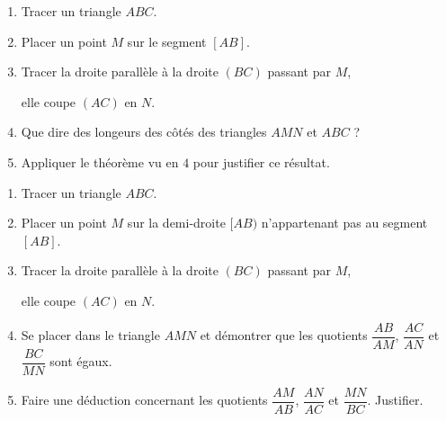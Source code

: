 \begin{activite}
    \partie[Configuration emboîtée]%
        \begin{minipage}{0.6\textwidth}
            \begin{enumerate}
                \item Tracer un triangle $ABC$.
                \item Placer un point $M$ sur le segment $[AB]$.
                \item Tracer la droite parallèle à la droite $(BC)$ passant par $M$,
                
                elle coupe $(AC)$ en $N$.
                \item Que dire des longeurs des côtés des triangles $AMN$ et $ABC$ ?
                \item Appliquer le théorème vu en $4$ pour justifier ce résultat.
            \end{enumerate}
        \end{minipage}
        \hspace*{1cm}
        \begin{minipage}{0.4\textwidth}
        \end{minipage}

        \begin{minipage}{0.6\textwidth}
            \begin{enumerate}
                \item Tracer un triangle $ABC$.
                \item Placer un point $M$ sur la demi-droite $[AB)$ n'appartenant pas au segment $[AB]$.
                \item Tracer la droite parallèle à la droite $(BC)$ passant par $M$,
                
                elle coupe $(AC)$ en $N$.
                \item Se placer dans le triangle $AMN$ et démontrer que les quotients
                $\dfrac{AB}{AM}$, $\dfrac{AC}{AN}$ et $\dfrac{BC}{MN}$ sont égaux.
                \item Faire une déduction concernant les quotients $\dfrac{AM}{AB}$, $\dfrac{AN}{AC}$ et $\dfrac{MN}{BC}$. Justifier.
            \end{enumerate}
        \end{minipage}
        \hspace*{1cm}
        \begin{minipage}{0.4\textwidth}
        \end{minipage}


\end{activite}
